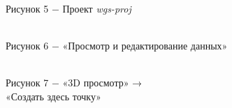 \documentclass[a4paper]{article}
\begin{document}
{\begin{center}
   \\
    Рисунок 5 $-$ Проект \textit{wgs-proj} 
\end{center}
\begin{center}
     \\
    Рисунок 6 $-$ «Просмотр и редактирование данных» 
\end{center}
\begin{center}
    \\
    Рисунок 7 $-$ «3D просмотр» →\\ «Создать здесь точку»
\end{center}
\begin{center}

\end{center}}
\end{document}
